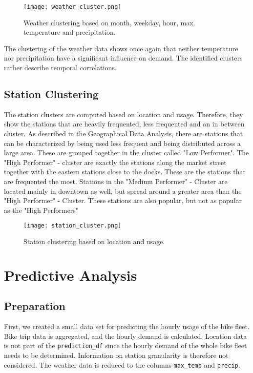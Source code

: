 \begin{figure}[hbtp]
    \texttt{[image: weather\_cluster.png]}
    \caption{Weather clustering based on month, weekday, hour, max. temperature and precipitation.}
\end{figure}

The clustering of the weather data shows once again that neither temperature nor precipitation have a significant influence on demand. The identified clusters rather describe temporal correlations.

\subsection{Station Clustering}

The station clusters are computed based on location and usage. Therefore, they show the stations that are heavily frequented, less frequented and an in between cluster. As described in the Geographical Data Analysis, there are stations that can be characterized by being used less frequent and being distributed across a large area. These are grouped together in the cluster called "Low Performer". The "High Performer" - cluster are exactly the stations along the market street together with the eastern stations close to the docks. These are the stations that are frequented the most. Stations in the "Medium Performer" - Cluster are located mainly in downtown as well, but spread around a greater area than the "High Performer" - Cluster. These stations are also popular, but not as popular as the "High Performers" 

\begin{figure}[hbtp]
    \texttt{[image: station\_cluster.png]}
    \caption{Station clustering based on location and usage.}
\end{figure}


\section{Predictive Analysis}

\subsection{Preparation}
First, we created a small data set for predicting the hourly usage of the bike fleet. Bike trip data is aggregated, and the hourly demand is calculated. Location data is not part of the \texttt{prediction\_df} since the hourly demand of the whole bike fleet needs to be determined. Information on station granularity is therefore not considered. The weather data is reduced to the columns \texttt{max\_temp} and \texttt{precip}. 


